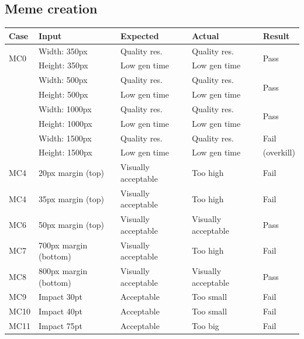 \documentclass[12pt]{report}
\begin{document}
\begin{appendices}
\clearpage

\subsection*{Meme creation}
\label{appendix:meme_creation_testing}

\begin{table}[ht]
  \centering
  \begin{tabular}{@{\extracolsep{1pt}}lllll}
  \toprule   
  {Case} & {Input} & {Expected} & {Actual} & {Result}\\
  \midrule
  \multirow{2}{*}{MC0} & Width: 350px & Quality res. & Quality res. & \multirow{2}{*}{Pass}\\ 
  & Height: 350px & Low gen time & Low gen time & \\
  \addlinespace[3pt]
  \multirow{2}{*}{MC1} & Width: 500px & Quality res. & Quality res. & \multirow{2}{*}{Pass}\\ 
  & Height: 500px & Low gen time & Low gen time & \\
  \addlinespace[3pt]
  \multirow{2}{*}{MC2} & Width: 1000px & Quality res. & Quality res. & \multirow{2}{*}{Pass}\\ 
  & Height: 1000px & Low gen time & Low gen time & \\
  \addlinespace[3pt]
  \multirow{2}{*}{MC3} & Width: 1500px & Quality res. & Quality res. & Fail\\ 
  & Height: 1500px & Low gen time & Low gen time & (overkill) \\
  \addlinespace[3pt]
  MC4 & 20px margin (top) & Visually acceptable & Too high & Fail\\ 
  \addlinespace[3pt]
  MC4 & 35px margin (top) & Visually acceptable & Too high & Fail\\ 
  \addlinespace[3pt]
  MC6 & 50px margin (top) & Visually acceptable & Visually acceptable & Pass\\ 
  \addlinespace[3pt]
  MC7 & 700px margin (bottom) & Visually acceptable & Too high & Fail\\ 
  \addlinespace[3pt]
  MC8 & 800px margin (bottom) & Visually acceptable & Visually acceptable & Pass\\ 
  \addlinespace[3pt]
  MC9 & Impact 30pt & Acceptable & Too small & Fail\\ 
  \addlinespace[3pt]
  MC10 & Impact 40pt & Acceptable & Too small & Fail\\ 
  \addlinespace[3pt]
  MC11 & Impact 75pt & Acceptable & Too big & Fail\\ 

\end{tabular}
\end{table}
\end{appendices}
\end{document}
